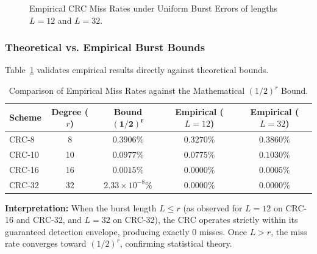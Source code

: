 \documentclass[11pt,a4paper]{article}
\begin{document}
\begin{figure}[H]
    \caption{Empirical CRC Miss Rates under Uniform Burst Errors of lengths $L = 12$ and $L = 32$.}
    \label{fig:burst_chart}
\end{figure}

\subsubsection{Theoretical vs. Empirical Burst Bounds}

Table~\ref{tab:burst_comparison} validates empirical results directly against theoretical bounds.

\begin{table}[H]
    \centering
    \small
    \setlength{\tabcolsep}{6pt}
    \begin{tabular}{lcccc}
        \toprule
        \textbf{Scheme} & \textbf{Degree ($r$)} & \textbf{Bound} $\boldsymbol{(1/2)^r}$ & \textbf{Empirical ($L = 12$)} & \textbf{Empirical ($L = 32$)} \\
        \midrule
        CRC-8  & 8  & $0.3906\%$              & $0.3270\%$ & $0.3860\%$ \\
        CRC-10 & 10 & $0.0977\%$              & $0.0775\%$ & $0.1030\%$ \\
        CRC-16 & 16 & $0.0015\%$              & $0.0000\%$ & $0.0005\%$ \\
        CRC-32 & 32 & $2.33 \times 10^{-8}\%$ & $0.0000\%$ & $0.0000\%$ \\
        \bottomrule
    \end{tabular}
    \caption{Comparison of Empirical Miss Rates against the Mathematical $(1/2)^r$ Bound.}
    \label{tab:burst_comparison}
\end{table}

\textbf{Interpretation:} When the burst length $L \le r$ (as observed for $L=12$ on CRC-16 and CRC-32, and $L=32$ on CRC-32), the CRC operates strictly within its guaranteed detection envelope, producing exactly $0$ misses. Once $L > r$, the miss rate converges toward $(1/2)^r$, confirming statistical theory.
\end{document}
